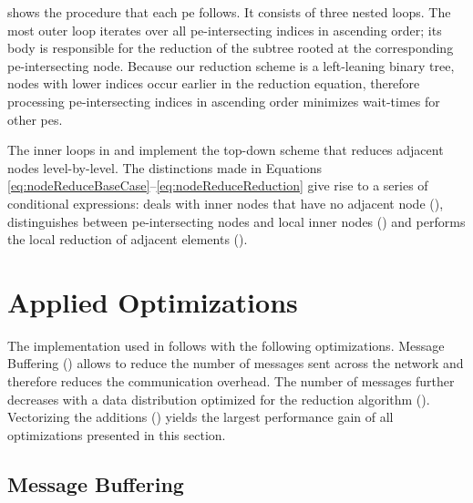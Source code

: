  shows the procedure that each \gls{pe} follows.
It consists of three nested loops.
The most outer loop iterates over all \gls{pe}-intersecting indices in ascending order; its body is responsible for the reduction of the subtree rooted at the corresponding \gls{pe}-intersecting node.
Because our reduction scheme is a left-leaning binary tree, nodes with lower indices occur earlier in the reduction equation, therefore processing \gls{pe}-intersecting indices in ascending order minimizes wait-times for other \glspl{pe}.


The inner loops in  and  implement the top-down scheme that reduces adjacent nodes level-by-level.
The distinctions made in Equations \eqref{eq:nodeReduceBaseCase}--\eqref{eq:nodeReduceReduction} give rise to a series of conditional expressions:  deals with inner nodes that have no adjacent node (),  distinguishes between \gls{pe}-intersecting nodes and local inner nodes () and  performs the local reduction of adjacent elements ().

\section{Applied Optimizations}
\label{sec:AppliedOptimizations}

The implementation used in  follows  with the following optimizations.
Message Buffering () allows to reduce the number of messages sent across the network and therefore reduces the communication overhead.
The number of messages further decreases with a data distribution optimized for the reduction algorithm ().
Vectorizing the additions () yields the largest performance gain of all optimizations presented in this section.

\subsection{Message Buffering}
\label{sec:MessageBuffering}

